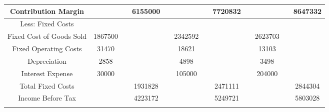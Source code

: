 {\begin{longtable}[c]{|c|c|c|c|c|c|c|c|c|c|c|c|}
\hline
Contribution Margin                                                                                                             &                                   &  & 6155000      &  &           &  & 7720832   &  &           &  & 8647332   \\
\hline
Less: Fixed Costs                                                                                                               &                                   &  &              &  &           &  &           &  &           &  &           \\
\hline
Fixed Cost of Goods Sold                                                                                                        & 1867500                           &  &              &  & 2342592   &  &           &  & 2623703   &  &           \\
\hline
Fixed Operating Costs                                                                                                           & 31470                             &  &              &  & 18621     &  &           &  & 13103     &  &           \\
\hline
Depreciation                                                                                                                    & 2858                              &  &              &  & 4898      &  &           &  & 3498      &  &           \\
\hline
Interest Expense                                                                                                                & 30000                             &  &              &  & 105000    &  &           &  & 204000    &  &           \\
\hline
Total Fixed Costs                                                                                                               &                                   &  & 1931828      &  &           &  & 2471111   &  &           &  & 2844304   \\
\hline
Income Before Tax                                                                                                               &                                   &  & 4223172      &  &           &  & 5249721   &  &           &  & 5803028   \\
\hline
                                                                                                                                &                                   &  &              &  &           &  &           &  &           &  &           \\

\end{longtable}}
